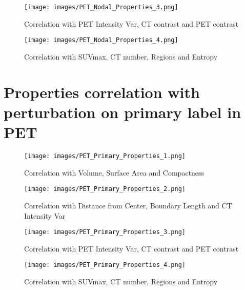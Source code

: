 \begin{figure}[ht]
    \centering
    \texttt{[image: images/PET\_Nodal\_Properties\_3.png]}
    \caption{Correlation with PET Intensity Var, CT contrast and PET contrast}
\end{figure}

\begin{figure}[ht]
    \centering
    \texttt{[image: images/PET\_Nodal\_Properties\_4.png]}
    \caption{Correlation with SUVmax, CT number, Regions and Entropy}
\end{figure}

\clearpage
\section{Properties correlation with perturbation on primary label in PET}

\begin{figure}[ht]
    \centering
    \texttt{[image: images/PET\_Primary\_Properties\_1.png]}
    \caption{Correlation with Volume, Surface Area and Compactness}
\end{figure}

\begin{figure}[ht]
    \centering
    \texttt{[image: images/PET\_Primary\_Properties\_2.png]}
    \caption{Correlation with Distance from Center, Boundary Length and CT Intensity Var}
\end{figure}

\begin{figure}[ht]
    \centering
    \texttt{[image: images/PET\_Primary\_Properties\_3.png]}
    \caption{Correlation with PET Intensity Var, CT contrast and PET contrast}
\end{figure}

\begin{figure}[ht]
    \centering
    \texttt{[image: images/PET\_Primary\_Properties\_4.png]}
    \caption{Correlation with SUVmax, CT number, Regions and Entropy}
\end{figure}



